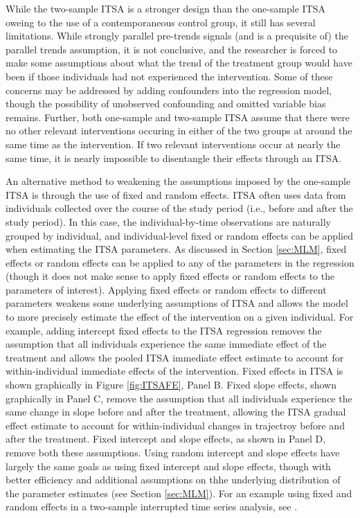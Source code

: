 \documentclass[12pt]{article}
\begin{document}
While the two-sample ITSA is a stronger design than the one-sample ITSA oweing to the use of a contemporaneous control group, it still has several limitations. While strongly parallel pre-trends signals (and is a prequisite of) the parallel trends assumption, it is not conclusive, and the researcher is forced to make some assumptions about what the trend of the treatment group would have been if those individuals had not experienced the intervention. Some of these concerns may be addressed by adding confounders into the regression model, though the possibility of unobserved confounding and omitted variable bias remains. Further, both one-sample and two-sample ITSA assume that there were no other relevant interventions occuring in either of the two groups at around the same time as the intervention. If two relevant interventions occur at nearly the same time, it is nearly impossible to disentangle their effects through an ITSA.

An alternative method to weakening the assumptions imposed by the one-sample ITSA is through the use of fixed and random effects. ITSA often uses data from individuals collected over the course of the study period (i.e., before and after the study period). In this case, the individual-by-time observations are naturally grouped by individual, and individual-level fixed or random effects can be applied when estimating the ITSA parameters. As discussed in Section \ref{sec:MLM}, fixed effects or random effects can be applied to any of the parameters in the regression (though it does not make sense to apply fixed effects or random effects to the parameters of interest). Applying fixed effects or random effects to different parameters weakens some underlying assumptions of ITSA and allows the model to more precisely estimate the effect of the intervention on a given individual. For example, adding intercept fixed effects to the ITSA regression removes the assumption that all individuals experience the same immediate effect of the treatment and allows the pooled ITSA immediate effect estimate to account for within-individual immediate effects of the intervention. Fixed effects in ITSA is shown graphically in Figure \ref{fig:ITSAFE}, Panel B. Fixed slope effects, shown graphically in Panel C, remove the assumption that all individuals experience the same change in slope before and after the treatment, allowing the ITSA gradual effect estimate to account for within-individual changes in trajectroy before and after the treatment. Fixed intercept and slope effects, as shown in Panel D, remove both these assumptions. Using random intercept and slope effects have largely the same goals as using fixed intercept and slope effects, though with better efficiency and additional assumptions on thhe underlying distribution of the parameter estimates (see Section \ref{sec:MLM}). For an example using fixed and random effects in a two-sample interrupted time series analysis, see \citep{avilaEffectExternalInspections2019}.
\end{document}
